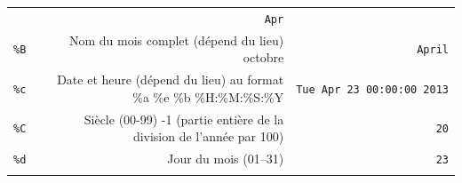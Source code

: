 \documentclass[12pt,]{book}
\numberwithin{equation}{section}
\numberwithin{countremarque}{section}
\begin{document}
\begin{longtable}[]{@{}rrr@{}}
\begin{minipage}[t]{0.60\columnwidth}
\end{minipage} & \begin{minipage}[t]{0.22\columnwidth}\raggedleft\strut
\texttt{Apr}\strut
\end{minipage}\tabularnewline
\begin{minipage}[t]{0.10\columnwidth}\raggedleft\strut
\texttt{\%B}\strut
\end{minipage} & \begin{minipage}[t]{0.60\columnwidth}\raggedleft\strut
Nom du mois complet (dépend du lieu) octobre\strut
\end{minipage} & \begin{minipage}[t]{0.22\columnwidth}\raggedleft\strut
\texttt{April}\strut
\end{minipage}\tabularnewline
\begin{minipage}[t]{0.10\columnwidth}\raggedleft\strut
\texttt{\%c}\strut
\end{minipage} & \begin{minipage}[t]{0.60\columnwidth}\raggedleft\strut
Date et heure (dépend du lieu) au format \%a \%e \%b
\%H:\%M:\%S:\%Y\strut
\end{minipage} & \begin{minipage}[t]{0.22\columnwidth}\raggedleft\strut
\texttt{Tue\ Apr\ 23\ 00:00:00\ 2013}\strut
\end{minipage}\tabularnewline
\begin{minipage}[t]{0.10\columnwidth}\raggedleft\strut
\texttt{\%C}\strut
\end{minipage} & \begin{minipage}[t]{0.60\columnwidth}\raggedleft\strut
Siècle (00-99) -1 (partie entière de la division de l'année par
100)\strut
\end{minipage} & \begin{minipage}[t]{0.22\columnwidth}\raggedleft\strut
\texttt{20}\strut
\end{minipage}\tabularnewline
\begin{minipage}[t]{0.10\columnwidth}\raggedleft\strut
\texttt{\%d}\strut
\end{minipage} & \begin{minipage}[t]{0.60\columnwidth}\raggedleft\strut
Jour du mois (01--31)\strut
\end{minipage} & \begin{minipage}[t]{0.22\columnwidth}\raggedleft\strut
\texttt{23}\strut
\end{minipage}\tabularnewline
\begin{minipage}[t]{0.10\columnwidth}\raggedleft\strut

\end{minipage}
\end{longtable}
\end{document}

